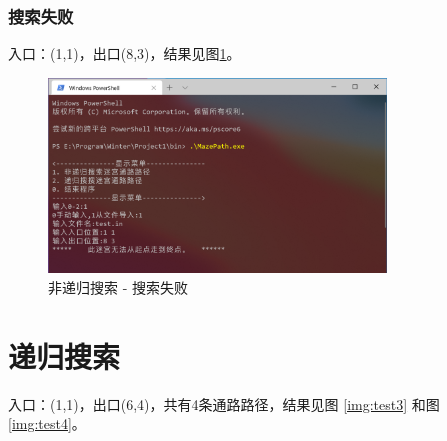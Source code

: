 \documentclass{ctexart}
\begin{document}
    \subsubsection{搜索失败}

    入口：(1,1)，出口(8,3)，结果见图\ref{img:test2}。

    \begin{figure}[h]
        \centering
        \includegraphics[width=0.8\textwidth]{测试结果6.png}
        \caption{非递归搜索 - 搜索失败}
        \label{img:test2}
    \end{figure}


    \section{递归搜索}

    入口：(1,1)，出口(6,4)，共有4条通路路径，结果见图 \ref{img:test3} 和图 \ref{img:test4}。
\end{document}
